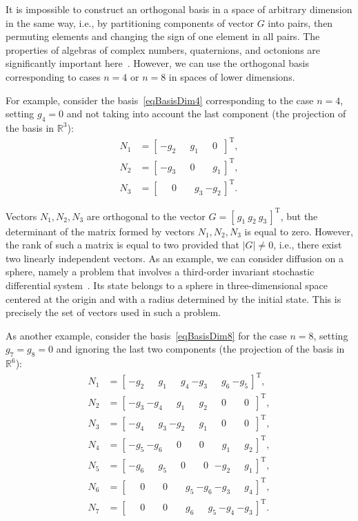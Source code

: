 \documentclass[10pt,reqno]{amsart}
\newcommand{\trans}{{\scriptscriptstyle \mathrm{T}}}
\newcommand{\mZi}{\phantom{-}0\phantom{_1}}
\theoremstyle{plain}
\theoremstyle{remark}
\begin{document}
It is impossible to construct an orthogonal basis in a space of arbitrary dimension in the same way, i.e., by partitioning components of vector $G$ into pairs, then permuting elements and changing the sign of one element in all pairs. The properties of algebras of complex numbers, quaternions, and octonions are significantly important here~\cite{KonSmi_03}. However, we can use the orthogonal basis corresponding to cases $n = 4$ or $n = 8$ in spaces of lower dimensions.

For example, consider the basis~\eqref{eqBasisDim4} corresponding to the case $n = 4$, setting $g_4 = 0$ and not taking into account the last component (the projection of the basis in $\mathds{R}^3$):
\begin{align*}
  N_1 & = [ \, {-g_2} ~ \phantom{-}g_1 ~ \mZi \, ]^\trans, \\
  N_2 & = [ \, {-g_3} ~ \mZi ~ \phantom{-}g_1 \, ]^\trans, \\
  N_3 & = [ \, \mZi ~ \phantom{-}g_3 ~ {-g_2} \, ]^\trans.
\end{align*}

Vectors $N_1,N_2,N_3$ are orthogonal to the vector $G = [ \, g_1 ~ g_2 ~ g_3 \, ]^\trans$, but the determinant of the matrix formed by vectors $N_1,N_2,N_3$ is equal to zero. However, the rank of such a matrix is equal to two provided that $|G| \neq 0$, i.e., there exist two linearly independent vectors. As an example, we can consider diffusion on a sphere, namely a problem that involves a third-order invariant stochastic differential system~\cite{Kar_14}. Its state belongs to a sphere in three-dimensional space centered at the origin and with a radius determined by the initial state. This is precisely the set of vectors used in such a problem.

As another example, consider the basis~\eqref{eqBasisDim8} for the case $n = 8$, setting $g_7 = g_8 = 0$ and ignoring the last two components (the projection of the basis in $\mathds{R}^6$):
\begin{align*}
  N_1 & = [ \, {-g_2} ~ \phantom{-}g_1 ~ \phantom{-}g_4 ~ {-g_3} ~ \phantom{-}g_6 ~ {-g_5} \, ]^\trans, \\
  N_2 & = [ \, {-g_3} ~ {-g_4} ~ \phantom{-}g_1 ~ \phantom{-}g_2 ~ \mZi ~ \mZi \, ]^\trans, \\
  N_3 & = [ \, {-g_4} ~ \phantom{-}g_3 ~ {-g_2} ~ \phantom{-}g_1 ~ \mZi ~ \mZi \, ]^\trans, \\
  N_4 & = [ \, {-g_5} ~ {-g_6} ~ \mZi ~ \mZi ~ \phantom{-}g_1 ~ \phantom{-}g_2 \, ]^\trans, \\
  N_5 & = [ \, {-g_6} ~ \phantom{-}g_5 ~ \mZi ~ \mZi ~ {-g_2} ~ \phantom{-}g_1 \, ]^\trans, \\
  N_6 & = [ \, \mZi ~ \mZi ~ \phantom{-}g_5 ~ {-g_6} ~ {-g_3} ~ \phantom{-}g_4 \, ]^\trans, \\
  N_7 & = [ \, \mZi ~ \mZi ~ \phantom{-}g_6 ~ \phantom{-}g_5 ~ {-g_4} ~ {-g_3} \, ]^\trans.
\end{align*}
\end{document}
